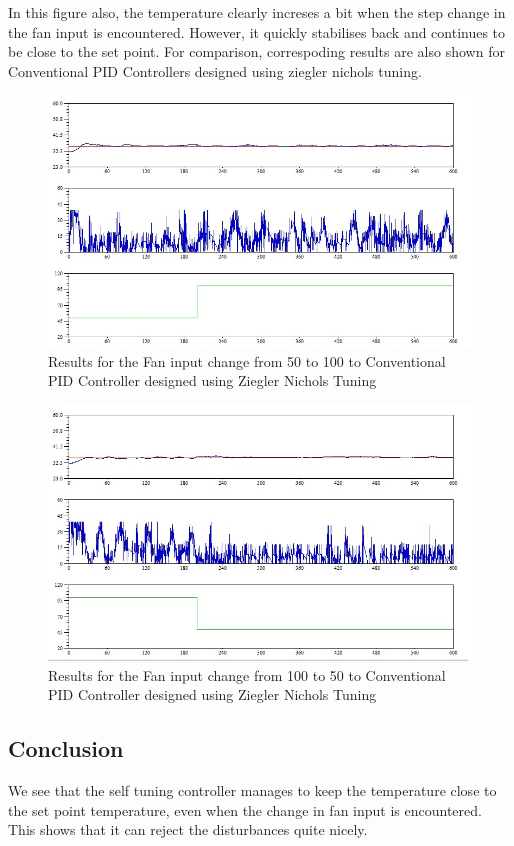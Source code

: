 In this figure also, the temperature clearly increses a bit when the step change in the fan input is encountered. However, it quickly stabilises back and continues to be close to the set point.
\newpage
For comparison, correspoding results are also shown for Conventional PID Controllers designed using ziegler nichols tuning.
\begin{figure}[h]
	\centering
\includegraphics[width=.75\linewidth]{Vikas_self/report_tex/PID_results/Conventional_Tuning/Fan_disturbance/PID/step50to100.jpg}
	\caption{Results for the Fan input change from 50 to 100 to Conventional PID Controller designed using Ziegler Nichols Tuning}
	
\end{figure}

\begin{figure}[h]
	\centering
\includegraphics[width=.75\linewidth]{Vikas_self/report_tex/PID_results/Conventional_Tuning/Fan_disturbance/PID/step100to50.jpg}
	\caption{Results for the Fan input change from 100 to 50 to Conventional PID Controller designed using Ziegler Nichols Tuning}
	
\end{figure}

\subsection{Conclusion}
We see that the self tuning controller manages to keep the temperature close to the set point temperature, even when the change in fan input is encountered. This shows that it can reject the disturbances quite nicely.

